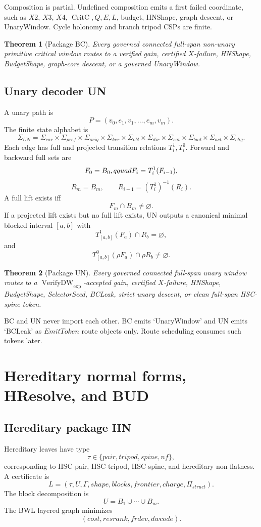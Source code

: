 \documentclass[10.5pt,a4paper]{article}
\newtheorem{theorem}{Theorem}[section]
\newcommand{\VerifyDW}{\operatorname{VerifyDW}_{\exp}}
\newcommand{\CritC}{\operatorname{CritC}}
\begin{document}
Composition is partial. Undefined composition emits a first failed coordinate, such as \(X2\), \(X3\), \(X4\), \(\CritC,Q,E,L\), budget, HNShape, graph descent, or UnaryWindow. Cycle holonomy and branch tripod CSPs are finite.

\begin{theorem}[Package BC]
Every governed connected full-span non-unary primitive critical window routes to a verified gain, certified \(X\)-failure, HNShape, BudgetShape, graph-core descent, or a governed UnaryWindow.
\end{theorem}

\subsection{Unary decoder UN}
A unary path is
\[
P=(v_0,e_1,v_1,\ldots,e_m,v_m).
\]
The finite state alphabet is
\[
\Sigma_{UN}=\Sigma_{car}\times\Sigma_{pref}\times\Sigma_{orig}\times\Sigma_{ker}\times\Sigma_{obl}\times\Sigma_{dir}\times\Sigma_{sat}\times\Sigma_{bud}\times\Sigma_{act}\times\Sigma_{chg}.
\]
Each edge has full and projected transition relations \(T_i^1,T_i^0\). Forward and backward full sets are
\[
F_0=B_0,\\qquad F_i=T_i^1(F_{i-1}),
\]
\[
R_m=B_m,\qquad R_{i-1}=(T_i^1)^{-1}(R_i).
\]
A full lift exists iff
\[
F_m\cap B_m\ne\varnothing.
\]
If a projected lift exists but no full lift exists, UN outputs a canonical minimal blocked interval \([a,b]\) with
\[
T_{[a,b]}^1(F_a)\cap R_b=\varnothing,
\]
and
\[
T_{[a,b]}^0(\rho F_a)\cap \rho R_b\ne\varnothing.
\]

\begin{theorem}[Package UN]
Every governed connected full-span unary window routes to a \(\VerifyDW\)-accepted gain, certified \(X\)-failure, HNShape, BudgetShape, SelectorSeed, BCLeak, strict unary descent, or clean full-span HSC-spine token.
\end{theorem}

BC and UN never import each other. BC emits `UnaryWindow' and UN emits `BCLeak' as \(EmitToken\) route objects only. Route scheduling consumes such tokens later.

\section{Hereditary normal forms, HResolve, and BUD}

\subsection{Hereditary package HN}
Hereditary leaves have type
\[
\tau\in\{pair,tripod,spine,nf\},
\]
corresponding to HSC-pair, HSC-tripod, HSC-spine, and hereditary non-flatness. A certificate is
\[
L=(\tau,U,\Gamma,shape,blocks,frontier,charge,\Pi_{struct}).
\]
The block decomposition is
\[
U=B_1\cup\cdots\cup B_m.
\]
The BWL layered graph minimizes
\[
(cost,resrank,frdev,dwcode).
\]
\end{document}
